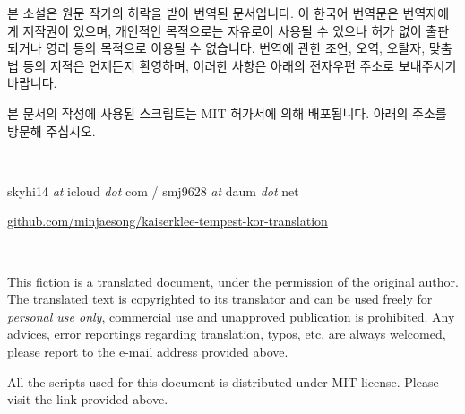 본 소설은 원문 작가의 허락을 받아 번역된 문서입니다. 이 한국어 번역문은 번역자에게 저작권이 있으며, 개인적인 목적으로는 자유로이 사용될 수 있으나 허가 없이 출판되거나 영리 등의 목적으로 이용될 수 없습니다. 번역에 관한 조언, 오역, 오탈자, 맞춤법 등의 지적은 언제든지 환영하며, 이러한 사항은 아래의 전자우편 주소로 보내주시기 바랍니다.

본 문서의 작성에 사용된 스크립트는 MIT 허가서에 의해 배포됩니다. 아래의 주소를 방문해 주십시오.

~

skyhi14 \emph{at} icloud \emph{dot} com / smj9628 \emph{at} daum \emph{dot} net

\href{https://github.com/minjaesong/kaiserklee-tempest-kor-translation}{github.com/minjaesong/kaiserklee-tempest-kor-translation}

~

{This fiction is a translated document, under the permission of the original author. The translated text is copyrighted to its translator and can be used freely for \emph{personal use only}, commercial use and unapproved publication is prohibited. Any advices, error reportings regarding translation, typos, etc. are always welcomed, please report to the e-mail address provided above.

All the scripts used for this document is distributed under MIT license. Please visit the link provided above.}